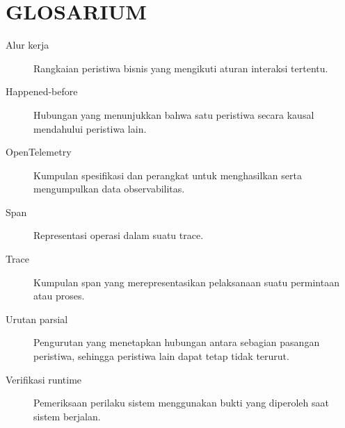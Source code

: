 \documentclass[proposal,indonesia]{ugmskripsi}
\begin{document}
\chapter*{GLOSARIUM}
\begin{description}
  \item[Alur kerja] Rangkaian peristiwa bisnis yang mengikuti aturan interaksi tertentu.
  \item[Happened-before] Hubungan yang menunjukkan bahwa satu peristiwa secara kausal mendahului peristiwa lain.
  \item[OpenTelemetry] Kumpulan spesifikasi dan perangkat untuk menghasilkan serta mengumpulkan data observabilitas.
  \item[Span] Representasi operasi dalam suatu trace.
  \item[Trace] Kumpulan span yang merepresentasikan pelaksanaan suatu permintaan atau proses.
  \item[Urutan parsial] Pengurutan yang menetapkan hubungan antara sebagian pasangan peristiwa, sehingga peristiwa lain dapat tetap tidak terurut.
  \item[Verifikasi runtime] Pemeriksaan perilaku sistem menggunakan bukti yang diperoleh saat sistem berjalan.
\end{description}

\clearpage
{}
{}


\appendix
\renewcommand{\thesection}{\thechapter.\arabic{section}}
\renewcommand{\thesubsection}{\thesection.\arabic{subsection}}

\end{document}
